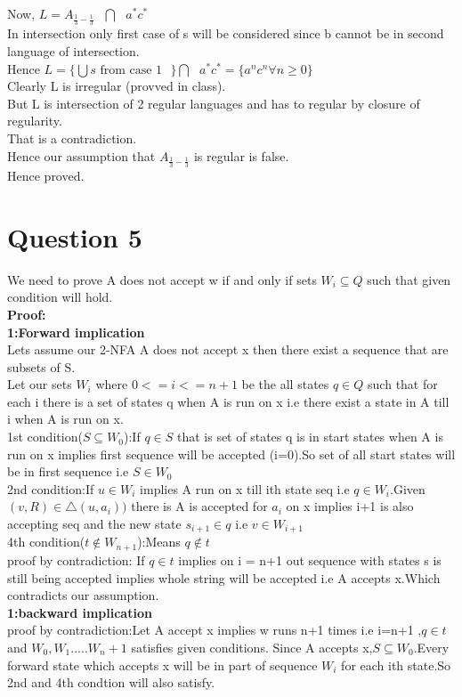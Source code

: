 \documentclass{article}
\begin{document}
Now, $L = A_{\frac{1}{3}-\frac{1}{3}} \text{ } \bigcap \text{ } a^*c^* $\\
In intersection only first case of s will be considered since b cannot be in second language of intersection.\\
Hence $L = \{ \bigcup {s \text{ from case 1}} \text{ } \} \bigcap \text{ } a^*c^* = \{a^nc^n \forall n \geq 0 \}$ \\
Clearly L is irregular (provved in class).\\
But L is intersection of 2 regular languages and has to regular by closure of regularity.\\
That is a contradiction.\\
Hence our assumption that $A_{\frac{1}{3}-\frac{1}{3}}$ is regular is false.\\
Hence proved.

\pagebreak


\section{Question 5}
We need to prove A does not accept w if and only if sets $W_i \subseteq Q$ such that given condition will hold.\\
\textbf{Proof:}\\
\textbf{1:Forward implication}
\\Lets assume our 2-NFA A does not accept x then there exist a sequence that are subsets of S.\\
Let our sets $W_i$ where $0<=i<=n+1$ be the all states $q \in Q$ such that for each i there is a set of states q when A is run on x i.e there exist a state in A till i when A is run on x.\\
1st condition($S \subseteq W_0 $):If $q \in S $ that is set of states q is in start states  when A is run on x implies first sequence will be accepted (i=0).So set of all start states will be in first sequence  i.e $S \in W_0$\\
2nd condition:If $u \in W_i$ implies A run on x till ith state seq i.e $q \in W_i$.Given $(v,R) \in \bigtriangleup(u,a_i))$  there is A is accepted for $a_i$ on x implies i+1 is also accepting seq and the new state $s_{i+1} \in q$ i.e $v \in W_{i+1}$
\\
4th condition($t \notin W_{n+1} $):Means $q \notin t$  \\
proof by contradiction:
If $q \in t $ implies on i = n+1 out sequence with states s is still being accepted implies whole string will be accepted i.e A accepts x.Which contradicts our assumption.\\
\textbf{1:backward implication}\\
proof by contradiction:Let A accept x implies  w runs n+1 times i.e i=n+1 ,$q \in t$ and $W_0,W_1.....W_n+1$ satisfies given conditions. Since A accepts x,$S \subseteq W_0$.Every forward state which accepts x will be in part of sequence $W_i$ for each ith state.So 2nd and 4th condtion will also satisfy.
\end{document}
